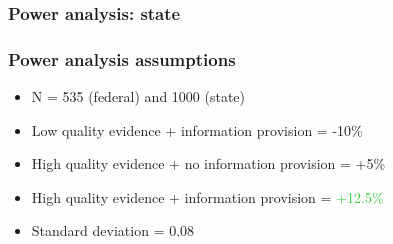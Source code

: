 \documentclass[usenames,dvipsnames]{beamer}
\begin{document}

\begin{frame}
\frametitle{Power analysis: state}


\end{frame}


\begin{frame}
\frametitle{Power analysis assumptions}

\begin{itemize}
\item N = 535 (federal) and 1000 (state)
\vspace{0.5cm}
\item Low quality evidence + information provision = \textcolor{BrickRed}{-10\%}
\item High quality evidence + no information provision = \textcolor{Emerald}{+5\%}
\item High quality evidence + information provision = \textcolor{LimeGreen}{+12.5\%}
\vspace{0.5cm}
\item Standard deviation = 0.08
\end{itemize}

\end{frame}
\end{document}
